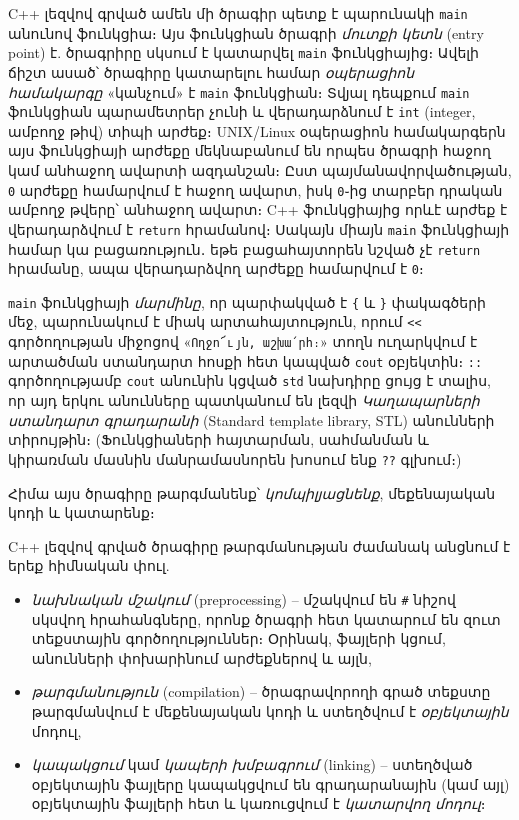 C++ լեզվով գրված ամեն մի ծրագիր պետք է պարունակի \texttt{main} անունով 
ֆունկցիա։ Այս ֆունկցիան ծրագրի \emph{մուտքի կետն} (entry point) է. 
ծրագրիրը սկսում է կատարվել \texttt{main} ֆունկցիայից։ Ավելի ճիշտ ասած՝ 
ծրագիրը կատարելու համար \emph{օպերացիոն համակարգը} «կանչում» է 
\texttt{main} ֆունկցիան։ Տվյալ դեպքում \texttt{main} ֆունկցիան պարամետրեր 
չունի և վերադարձնում է \texttt{int} (integer, ամբողջ թիվ) տիպի արժեք։ 
UNIX/Linux օպերացիոն համակարգերն այս ֆունկցիայի արժեքը մեկնաբանում են 
որպես ծրագրի հաջող կամ անհաջող ավարտի ազդանշան։ Ըստ պայմանավորվածության, 
\texttt{0} արժեքը համարվում է հաջող ավարտ, իսկ \texttt{0}֊ից տարբեր դրական
ամբողջ թվերը՝ անհաջող ավարտ։ C++ ֆունկցիայից որևէ արժեք է վերադարձվում է 
\texttt{return} հրամանով։ Սակայն միայն \texttt{main} ֆունկցիայի համար կա 
բացառություն․ եթե բացահայտորեն նշված չէ \texttt{return} հրամանը, ապա 
վերադարձվող արժեքը համարվում է \texttt{0}։

\texttt{main} ֆունկցիայի \emph{մարմինը}, որ պարփակված է \verb|{| և 
\verb|}| փակագծերի մեջ, պարունակում է միակ արտահայտություն, որում 
\verb|<<| գործողության միջոցով «\texttt{Ողջո՜ւյն, աշխա՛րհ։}» տողն 
ուղարկվում է արտածման ստանդարտ հոսքի հետ կապված \texttt{cout} օբյեկտին։ 
\verb|::| գործողությամբ \texttt{cout} անունին կցված \texttt{std} նախդիրը 
ցույց է տալիս, որ այդ երկու անունները պատկանում են լեզվի \emph{Կաղապարների 
ստանդարտ գրադարանի} (Standard template library, STL) անունների տիրույթին։ 
(Ֆունկցիաների հայտարման, սահմանման և կիրառման մասնին մանրամասնորեն խոսում 
ենք \verb|??| գլխում։)

Հիմա այս ծրագիրը թարգմանենք՝ \emph{կոմպիլյացնենք}, մեքենայական կոդի և կատարենք։

C++ լեզվով գրված ծրագիրը թարգմանության ժամանակ անցնում է երեք հիմնական փուլ.
\begin{itemize}
\item \emph{նախնական մշակում} (preprocessing) -- մշակվում են \verb|#| 
նիշով սկսվող հրահանգները, որոնք ծրագրի հետ կատարում են զուտ տեքստային 
գործողություններ։ Օրինակ, ֆայլերի կցում, անունների փոխարինում արժեքներով 
և այլն,
\item \emph{թարգմանություն} (compilation) -- ծրագրավորողի գրած տեքստը 
թարգմանվում է մեքենայական կոդի և ստեղծվում է \emph{օբյեկտային} մոդուլ,
\item \emph{կապակցում} կամ \emph{կապերի խմբագրում} (linking) -- ստեղծված 
օբյեկտային ֆայլերը կապակցվում են գրադարանային (կամ այլ) օբյեկտային ֆայլերի 
հետ և կառուցվում է \emph{կատարվող մոդուլ}։
\end{itemize}

